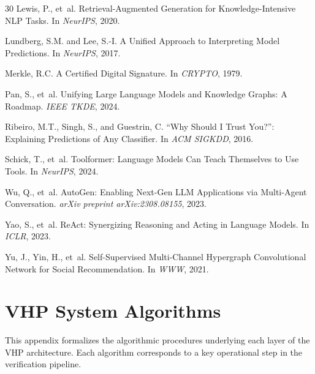 \documentclass[11pt,a4paper]{article}
\begin{document}
\begin{thebibliography}{30}
Lewis, P., et~al.
\newblock Retrieval-Augmented Generation for Knowledge-Intensive NLP Tasks.
\newblock In \emph{NeurIPS}, 2020.

Lundberg, S.M. and Lee, S.-I.
\newblock A Unified Approach to Interpreting Model Predictions.
\newblock In \emph{NeurIPS}, 2017.

Merkle, R.C.
\newblock A Certified Digital Signature.
\newblock In \emph{CRYPTO}, 1979.

Pan, S., et~al.
\newblock Unifying Large Language Models and Knowledge Graphs: A Roadmap.
\newblock \emph{IEEE TKDE}, 2024.

Ribeiro, M.T., Singh, S., and Guestrin, C.
\newblock ``Why Should I Trust You?'': Explaining Predictions of Any Classifier.
\newblock In \emph{ACM SIGKDD}, 2016.

Schick, T., et~al.
\newblock Toolformer: Language Models Can Teach Themselves to Use Tools.
\newblock In \emph{NeurIPS}, 2024.

Wu, Q., et~al.
\newblock AutoGen: Enabling Next-Gen LLM Applications via Multi-Agent Conversation.
\newblock \emph{arXiv preprint arXiv:2308.08155}, 2023.

Yao, S., et~al.
\newblock ReAct: Synergizing Reasoning and Acting in Language Models.
\newblock In \emph{ICLR}, 2023.

Yu, J., Yin, H., et~al.
\newblock Self-Supervised Multi-Channel Hypergraph Convolutional Network for Social Recommendation.
\newblock In \emph{WWW}, 2021.

\end{thebibliography}

\appendix

\section{VHP System Algorithms}
\label{app:algorithms}

This appendix formalizes the algorithmic procedures underlying each layer of the VHP architecture. Each algorithm corresponds to a key operational step in the verification pipeline.
\end{document}
